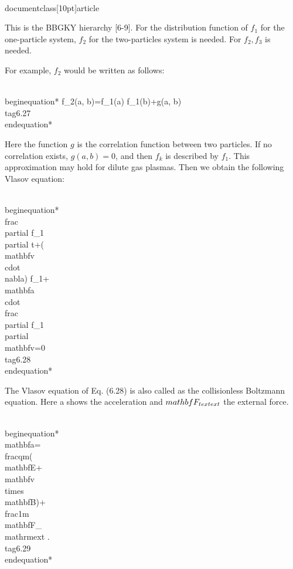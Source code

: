 \\documentclass[10pt]{article}
\begin{document}
{{{{This is the BBGKY hierarchy [6-9]. For the distribution function of $f_{1}$ for the one-particle system, $f_{2}$ for the two-particles system is needed. For $f_{2}, f_{3}$ is needed.

For example, $f_{2}$ would be written as follows:


\\begin{equation*}
f_{2}(a, b)=f_{1}(a) f_{1}(b)+g(a, b) \\tag{6.27}
\\end{equation*}


Here the function $g$ is the correlation function between two particles. If no correlation exists, $g(a, b)=0$, and then $f_{k}$ is described by $f_{1}$. This approximation may hold for dilute gas plasmas. Then we obtain the following Vlasov equation:


\\begin{equation*}
\\frac{\\partial f_{1}}{\\partial t}+(\\mathbf{v} \\cdot \\nabla) f_{1}+\\mathbf{a} \\cdot \\frac{\\partial f_{1}}{\\partial \\mathbf{v}}=0 \\tag{6.28}
\\end{equation*}


The Vlasov equation of Eq. (6.28) is also called as the collisionless Boltzmann equation. Here a shows the acceleration and $\\mathbf{F}_{\\text {ext }}$ the external force.


\\begin{equation*}
\\mathbf{a}=\\frac{q}{m}(\\mathbf{E}+\\mathbf{v} \\times \\mathbf{B})+\\frac{1}{m} \\mathbf{F}_{\\mathrm{ext}} . \\tag{6.29}
\\end{equation*}


}}}}
\end{document}
